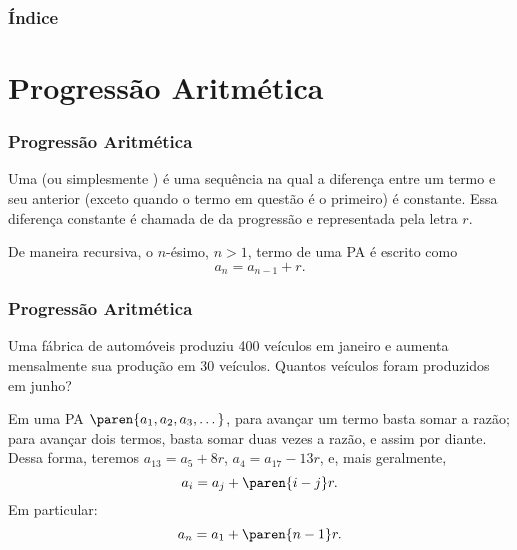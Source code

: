 \documentclass[10pt]{beamer}
\begin{document}
	


	{\backgroundimage\begin{frame}[plain]
		\titlepage
	\end{frame}}



	\begin{frame}
		\frametitle{Índice}
		\tableofcontents
	\end{frame}


	
\section{Progressão Aritmética}
\begin{frame} \frametitle{Progressão Aritmética}
\begin{definicao}
Uma  (ou simplesmente ) é uma
sequência na qual a diferença entre um termo e seu anterior (exceto
quando o termo em questão é o primeiro) é constante. Essa diferença
constante é chamada de  da progressão e representada pela
letra $r$.
\end{definicao}


De maneira recursiva, o $n$-ésimo, $n>1$, termo de uma PA é escrito
como
$$a_n = a_{n-1} + r.$$


\end{frame}


\begin{frame}
\frametitle{Progressão Aritmética} %
\begin{exemplo}
Uma fábrica de automóveis produziu 400 veículos em janeiro e aumenta
mensalmente sua produção em 30 veículos. Quantos veículos foram
produzidos em junho?
\end{exemplo} \pause

Em uma PA $\paren{ a_1 , a_2 , a_3 , \dots }$, para avançar um termo
basta somar a razão; para avançar dois termos, basta somar duas
vezes a razão, e assim por diante. Dessa forma, teremos $a_{13} = a_5
+8r$, $a_4 = a_{17} - 13r$, e, mais geralmente, $$a_i = a_j +
\paren{i-j}r.$$
Em particular:
$$a_n = a_1 + \paren{n-1}r.$$

\end{frame}
\end{document}
